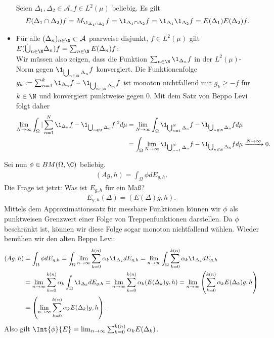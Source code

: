 \begin{solution}
\begin{itemize}
  Seien $\Delta_1,\Delta_2 \in \mathcal{A}, f \in L^2(\mu)$ beliebig. Es gilt
  \begin{align*}
    E(\Delta_1 \cap \Delta_2)f = M_{\1_{\Delta_1 \cap \Delta_2}}f
    = \1_{\Delta_1 \cap \Delta_2}f = \1_{\Delta_1}\1_{\Delta_2}f
    = E(\Delta_1)E(\Delta_2)f.
  \end{align*}
  \item Für alle $(\Delta_n)_{n \in \N} \subset \mathcal{A}$ paarweise disjunkt, $f \in L^2(\mu)$ gilt $E(\dot\bigcup_{n \in \N}\Delta_n)f = \sum_{n \in \N}E(\Delta_n)f$: \\
  Wir müssen also zeigen, dass die Funktion $\sum_{n \in \N}\1_{\Delta_n}f$
  in der $L^2(\mu)$-Norm gegen $\1_{\bigcup_{n \in \N}\Delta_n}f$ konvergiert.
  Die Funktionenfolge $g_k := \sum_{n = 1}^k\1_{\Delta_n}f - \1_{\bigcup_{n \in \N}\Delta_n}f$ ist monoton nichtfallend mit $g_k \geq -f$ für $k \in \N$
  und konvergiert punktweise gegen $0$.
  Mit dem Satz von Beppo Levi folgt daher
  \begin{align*}
  \lim_{N \to \infty}\int_\Omega |\sum_{n = 1}^N\1_{\Delta_n}f - \1_{\bigcup_{n \in \N}\Delta_n}f|^2 d\mu
  &= \lim_{N \to \infty}\int_\Omega \1_{\bigcup_{n = 1}^N\Delta_n}f -
  \1_{\bigcup_{n \in \N}\Delta_n}f
   d\mu \\
  &= \int_\Omega \lim_{N \to \infty} \1_{\bigcup_{n = 1}^N\Delta_n}f -
  \1_{\bigcup_{n \in \N}\Delta_n}f d\mu \xrightarrow{N \to \infty} 0.
  \end{align*}
\end{itemize}
Sei nun $\phi \in BM(\Omega,\C)$ beliebig.
\begin{align*}
  (Ag,h) = \int_{\Omega}\phi dE_{g,h}.
\end{align*}
Die Frage ist jetzt: Was ist $E_{g,h}$ für ein Maß?
\begin{align*}
  E_{g,h}(\Delta) = (E(\Delta)g,h).
\end{align*}
Mittels dem Approximationssatz für messbare Funktionen können wir $\phi$
als punktweisen Grenzwert einer Folge von Treppenfunktionen darstellen.
Da $\phi$ beschränkt ist, können wir diese Folge sogar monoton nichtfallend wählen.
Wieder bemühen wir den alten Beppo Levi:
\begin{align*}
  (Ag,h) &= \int_{\Omega}\phi dE_{g,h} = \int_{\Omega}\lim_{n \to \infty}
  \sum_{k=0}^{k(n)}\alpha_k\1_{\Delta_k} dE_{g,h}
  = \lim_{n \to \infty}\int_{\Omega}\sum_{k=0}^{k(n)}\alpha_k\1_{\Delta_k} dE_{g,h} \\
  &= \lim_{n \to \infty}\sum_{k=0}^{k(n)}\alpha_k\int_{\Omega}\1_{\Delta_k} dE_{g,h}
  = \lim_{n \to \infty}\sum_{k=0}^{k(n)}\alpha_k(E(\Delta_k)g,h)
  = \lim_{n \to \infty}\left(\sum_{k=0}^{k(n)}\alpha_kE(\Delta_k)g,h\right) \\
  &= \left(\lim_{n \to \infty}\sum_{k=0}^{k(n)}\alpha_kE(\Delta_k)g,h\right).
\end{align*}
Also gilt $\Int{\phi}{E} = \lim_{n \to \infty}\sum_{k=0}^{k(n)}\alpha_kE(\Delta_k)$.
\end{solution}
